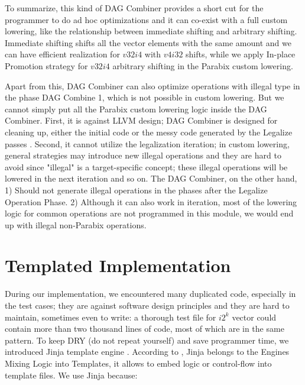 To summarize, this kind of DAG Combiner provides a short cut for the programmer to do ad hoc optimizations and it can co-exist with a full custom lowering, like the relationship between immediate shifting and arbitrary shifting. Immediate shifting shifts all the vector elements with the same amount and we can have efficient realization for $v32i4$ with $v4i32$ shifts, while we apply In-place Promotion strategy for $v32i4$ arbitrary shifting in the Parabix custom lowering.

Apart from this, DAG Combiner can also optimize operations with illegal type in the phase DAG Combine 1, which is not possible in custom lowering. But we cannot simply put all the Parabix custom lowering logic inside the DAG Combiner. First, it is against LLVM design; DAG Combiner is designed for cleaning up, either the initial code or the messy code generated by the Legalize passes \cite{llvm_code_gen}. Second, it cannot utilize the legalization iteration; in custom lowering, general strategies may introduce new illegal operations and they are hard to avoid since "illegal" is a target-specific concept; these illegal operations will be lowered in the next iteration and so on. The DAG Combiner, on the other hand, 1) Should not generate illegal operations in the phases after the Legalize Operation Phase. 2) Although it can also work in iteration, most of the lowering logic for common operations are not programmed in this module, we would end up with illegal non-Parabix operations.

\section{Templated Implementation}
During our implementation, we encountered many duplicated code, especially in the test cases; they are against software design principles and they are hard to maintain, sometimes even to write: a thorough test file for $i2^k$ vector could contain more than two thousand lines of code, most of which are in the same pattern. To keep DRY (do not repeat yourself) and save programmer time, we introduced Jinja template engine \cite{jinja_engine}. According to \cite{python_templating}, Jinja belongs to the Engines Mixing Logic into Templates, it allows to embed logic or control-flow into template files. We use Jinja because:

